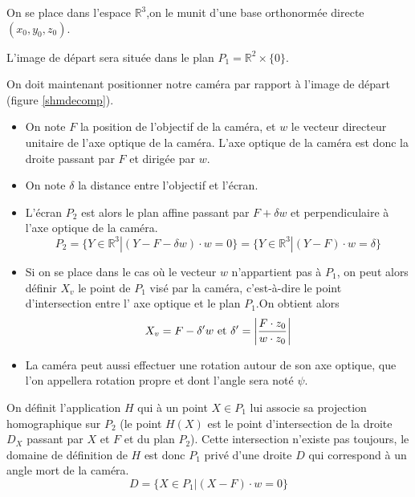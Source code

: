\begin{defnot}
On se place dans l'espace $\mathbb{R}^{3}$,on le munit d'une base orthonormée directe $(x_0,y_0,z_0)$.

L'image de départ sera située dans le plan $P_{1}= \mathbb{R}^{2}\times \{0\}$.

On doit maintenant positionner notre caméra par rapport à l'image de départ (figure \ref{shmdecomp}).

\begin{itemize}
\item On note $F$ la position de l'objectif de la caméra, et $w$ le vecteur directeur unitaire de l'axe optique de la caméra. L'axe optique de la caméra est donc la droite passant par $F$ et dirigée par $w$.

\item On note $\delta$ la distance entre l'objectif et l'écran.

\item L'écran $P_{2}$ est alors le plan affine passant par $F+\delta w$ et perpendiculaire à l'axe optique de la caméra.
\begin{equation*}
P_{2}=\{Y\in \mathbb{R}^{3}|(Y-F-\delta w)\cdot w=0\}=\{Y\in \mathbb{R}^{3}|(Y-F)\cdot w=\delta\}
\end{equation*}

\item Si on se place dans le cas où le vecteur $w$ n'appartient pas à $P_{1}$, on peut alors définir $X_{v}$ le point de $P_{1}$ visé par la caméra, c'est-à-dire le point d'intersection entre l' axe optique et le plan $P_{1}$.On obtient alors
\begin{equation*}
X_{v}=F-\delta'w \text{ et }\delta'=\small{\left|\frac{F \cdot z_{0}}{w\cdot z_{0}} \right|}
\end{equation*}

\item La caméra peut aussi effectuer une rotation autour de son axe optique, que l'on appellera rotation propre et dont l'angle sera noté $\psi$.
\end{itemize}

On définit l'application $H$ qui à un point $X\in P_{1}$ lui associe sa projection homographique sur $P_{2}$ (le point $H(X)$ est le point d'intersection de la droite $D_{X}$ passant par $X$ et $F$ et du plan $P_{2}$). Cette intersection n'existe pas toujours, le domaine de définition de $H$ est donc $P_1$ privé d'une droite $D$ qui correspond à un angle mort de la caméra.
\begin{equation*}
D=\{X\in P_1 | (X-F) \cdot w=0\}
\end{equation*}


\end{defnot}
